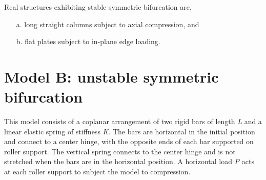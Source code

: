 \documentclass{AeroStructure-ERJohnson}
\begin{document}
Real structures exhibiting stable symmetric bifurcation are,
\begin{enumerate}
  \item[a.] long straight columns subject to axial compression, and
  \item[b.] flat plates subject to in-plane edge loading.
\end{enumerate}

{\def\thefigure{10.11}
}

\vspace*{-0.6pc}

\section{Model B: unstable symmetric bifurcation}\label{sec10.2}

This model consists of a coplanar arrangement of two rigid bars of length \textit{L} and a linear elastic spring of stiffness \textit{K}. The bars are horizontal in the initial position and connect to a center hinge, with the opposite ends of each bar supported on roller support. The vertical spring connects to the center hinge and is not stretched when the bars are in the horizontal position. A horizontal load \textit{P} acts at each roller support to subject the model to compression.

{\def\thefigure{10.12}
}
\end{document}
